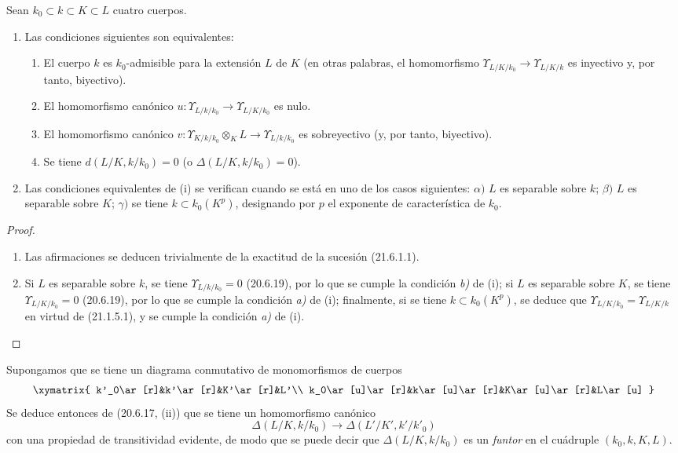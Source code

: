 \begin{proposition}[21.6.2]
\label{0.21.6.2-fr}
Sean $k_0\subset k\subset K\subset L$ cuatro cuerpos.
\begin{enumerate}
  \item[\rm (i)] Las condiciones siguientes son equivalentes:
  \begin{enumerate}
    \item[\rm a)] El cuerpo $k$ es $k_0$-admisible para la extensión $L$ de $K$
    (en otras palabras, el homomorfismo $\Upsilon_{L/K/k_0}\to
    \Upsilon_{L/K/k}$ es inyectivo y, por tanto, biyectivo).
    \item[\rm b)] El homomorfismo canónico
    $u:\Upsilon_{L/k/k_0}\to\Upsilon_{L/K/k_0}$ es nulo.
    \item[\rm c)] El homomorfismo canónico
    $v:\Upsilon_{K/k/k_0}\otimes_KL\to\Upsilon_{L/k/k_0}$ es sobreyectivo
    (y, por tanto, biyectivo).
    \item[\rm d)] Se tiene $d(L/K,k/k_0)=0$ (o
    $\Delta(L/K,k/k_0)=0$).
  \end{enumerate}
  \item[\rm (ii)] Las condiciones equivalentes de \textup{(i)} se verifican cuando
  se está en uno de los casos siguientes: $\alpha)$ $L$ es separable sobre $k$;
  $\beta)$ $L$ es separable sobre $K$; $\gamma)$ se tiene
  $k\subset k_0(K^p)$, designando por $p$ el exponente de característica de $k_0$.
\end{enumerate}
\end{proposition}

\begin{proof}
\begin{enumerate}
  \item[(i)] Las afirmaciones se deducen trivialmente de la exactitud de la sucesión
  (21.6.1.1).
  \item[(ii)] Si $L$ es separable sobre $k$, se tiene
  $\Upsilon_{L/k/k_0}=0$ (20.6.19), por lo que se cumple la condición \emph{b)} de (i);
  si $L$ es separable sobre $K$, se tiene
  $\Upsilon_{L/K/k_0}=0$ (20.6.19), por lo que se cumple la condición \emph{a)} de (i);
  finalmente, si se tiene $k\subset k_0(K^p)$, se deduce que
  $\Upsilon_{L/K/k_0}=\Upsilon_{L/K/k}$ en virtud de (21.1.5.1), y se cumple
  la condición \emph{a)} de (i).
\end{enumerate}
\end{proof}
\begin{env}[21.6.3]
\label{0.21.6.3-fr}
Supongamos que se tiene un diagrama conmutativo de monomorfismos de cuerpos
\[
\xymatrix{
 k'_0\ar[r]&k'\ar[r]&K'\ar[r]&L'\\
 k_0\ar[u]\ar[r]&k\ar[u]\ar[r]&K\ar[u]\ar[r]&L\ar[u]
}
\]
Se deduce entonces de (20.6.17, (ii)) que se tiene un homomorfismo canónico
\begin{equation}
\tag{21.6.3.1}
\label{0.21.6.3.1-fr}
\Delta(L/K,k/k_0)\longrightarrow\Delta(L'/K',k'/k'_0)
\end{equation}
con una propiedad de transitividad evidente, de modo que se puede decir que
$\Delta(L/K,k/k_0)$ es un \emph{funtor} en el cuádruple
$(k_0,k,K,L)$.
\end{env}

